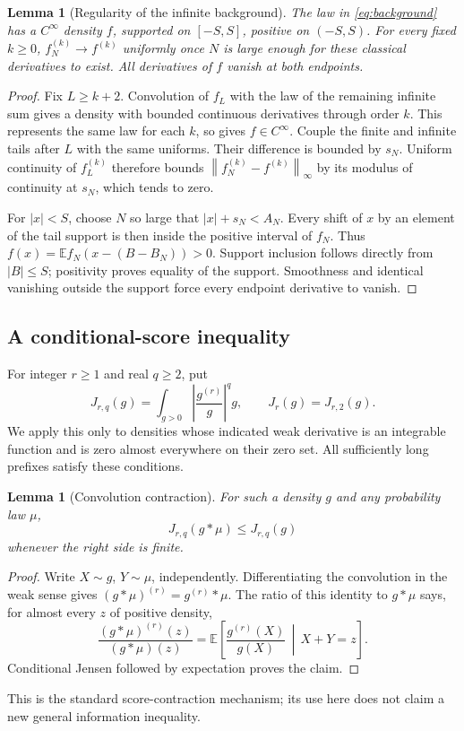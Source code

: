 \documentclass[11pt,a4paper]{article}
\numberwithin{equation}{section}
\newtheorem{lemma}[theorem]{Lemma}
\theoremstyle{definition}
\theoremstyle{remark}
\newcommand{\E}{\mathbb E}
\newcommand{\norm}[1]{\left\lVert#1\right\rVert}
\begin{document}
\begin{lemma}[Regularity of the infinite background]
\label{lem:smooth}
The law in \eqref{eq:background} has a $C^\infty$ density $f$, supported on
$[-S,S]$, positive on $(-S,S)$. For every fixed $k\ge0$,
$f_N^{(k)}\to f^{(k)}$ uniformly once $N$ is large enough for these classical
derivatives to exist. All derivatives of $f$ vanish at both endpoints.
\end{lemma}
\begin{proof}
Fix $L\ge k+2$. Convolution of $f_L$ with the law of the remaining infinite
sum gives a density with bounded continuous derivatives through order $k$.
This represents the same law for each $k$, so gives $f\in C^\infty$.
Couple the finite and infinite tails after $L$ with the same uniforms.
Their difference is bounded by $s_N$. Uniform continuity of $f_L^{(k)}$
therefore bounds $\norm{f_N^{(k)}-f^{(k)}}_\infty$ by its modulus of
continuity at $s_N$, which tends to zero.

For $|x|<S$, choose $N$ so large that $|x|+s_N<A_N$. Every shift of $x$ by
an element of the tail support is then inside the positive interval of
$f_N$. Thus $f(x)=\E f_N(x-(B-B_N))>0$. Support inclusion follows directly
from $|B|\le S$; positivity proves equality of the support. Smoothness and
identical vanishing outside the support force every endpoint derivative to
vanish.
\end{proof}

\subsection{A conditional-score inequality}
For integer $r\ge1$ and real $q\ge2$, put
\begin{equation}
 J_{r,q}(g)=\int_{g>0}\left|\frac{g^{(r)}}g\right|^qg,
 \qquad J_r(g)=J_{r,2}(g).
 \label{eq:Jrq}
\end{equation}
We apply this only to densities whose indicated weak derivative is an
integrable function and is zero almost everywhere on their zero set.
All sufficiently long prefixes satisfy these conditions.

\begin{lemma}[Convolution contraction]
\label{lem:score}
For such a density $g$ and any probability law $\mu$,
\begin{equation}
 J_{r,q}(g*\mu)\le J_{r,q}(g)
 \label{eq:contraction-J}
\end{equation}
whenever the right side is finite.
\end{lemma}
\begin{proof}
Write $X\sim g$, $Y\sim\mu$, independently. Differentiating the convolution
in the weak sense gives $(g*\mu)^{(r)}=g^{(r)}*\mu$. The ratio of this
identity to $g*\mu$ says, for almost every $z$ of positive density,
\[
 \frac{(g*\mu)^{(r)}(z)}{(g*\mu)(z)}
 =\E\left[\frac{g^{(r)}(X)}{g(X)}\,\middle|\,X+Y=z\right].
\]
Conditional Jensen followed by expectation proves the claim.
\end{proof}
This is the standard score-contraction mechanism; its use here does not
claim a new general information inequality.
\end{document}

